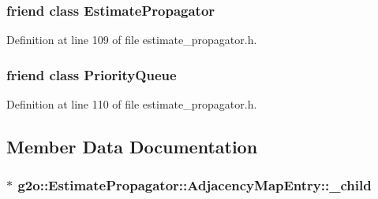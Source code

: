 \subsubsection[{\texorpdfstring{Estimate\+Propagator}{EstimatePropagator}}]{\setlength{\rightskip}{0pt plus 5cm}friend class {\bf Estimate\+Propagator}\hspace{0.3cm}{\ttfamily [friend]}}\hypertarget{classg2o_1_1EstimatePropagator_1_1AdjacencyMapEntry_a84fd16bbb058a331370b1b9983896264}{}\label{classg2o_1_1EstimatePropagator_1_1AdjacencyMapEntry_a84fd16bbb058a331370b1b9983896264}


Definition at line 109 of file estimate\+\_\+propagator.\+h.

\subsubsection[{\texorpdfstring{Priority\+Queue}{PriorityQueue}}]{\setlength{\rightskip}{0pt plus 5cm}friend class {\bf Priority\+Queue}\hspace{0.3cm}{\ttfamily [friend]}}\hypertarget{classg2o_1_1EstimatePropagator_1_1AdjacencyMapEntry_afde21c6f1b41de5a73362b2fcfec056b}{}\label{classg2o_1_1EstimatePropagator_1_1AdjacencyMapEntry_afde21c6f1b41de5a73362b2fcfec056b}


Definition at line 110 of file estimate\+\_\+propagator.\+h.



\subsection{Member Data Documentation}
\subsubsection[{\texorpdfstring{\+\_\+child}{_child}}]{$\ast$ g2o\+::\+Estimate\+Propagator\+::\+Adjacency\+Map\+Entry\+::\+\_\+child\hspace{0.3cm}{\ttfamily [protected]}}\hypertarget{classg2o_1_1EstimatePropagator_1_1AdjacencyMapEntry_ab6f716e85cc15e6d9c570132fe889fd6}{}\label{classg2o_1_1EstimatePropagator_1_1AdjacencyMapEntry_ab6f716e85cc15e6d9c570132fe889fd6}


